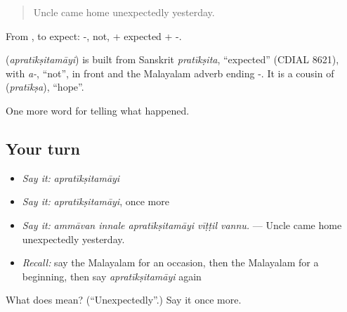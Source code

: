 \begin{quote}
Uncle came home unexpectedly yesterday.
\end{quote}

From , to expect: -, not, + expected + -.

\begin{cousinweb}
\textbf{} (\emph{apratīkṣitamāyi}) is built from Sanskrit \emph{pratīkṣita}, \textquotedblleft{}expected\textquotedblright{} (CDIAL 8621), with \emph{a-}, \textquotedblleft{}not\textquotedblright{}, in front and the Malayalam adverb ending -. It is a cousin of  (\emph{pratīkṣa}), \textquotedblleft{}hope\textquotedblright{}.
\end{cousinweb}

\begin{grammarlens}[title={What you've built}]
One more word for telling what happened.
\end{grammarlens}

\subsection*{Your turn}
\begin{itemize}
\raggedright
  \item \emph{Say it:} \emph{apratīkṣitamāyi}
  \item \emph{Say it:} \emph{apratīkṣitamāyi}, once more
  \item \emph{Say it:} \emph{ammāvan innale apratīkṣitamāyi vīṭṭil vannu.} — Uncle came home unexpectedly yesterday.
  \item \emph{Recall:} say the Malayalam for an occasion, then the Malayalam for a beginning, then say \emph{apratīkṣitamāyi} again
\end{itemize}

\begin{tcolorbox}[breakable,colback=teal!4,colframe=teal!35!black,title={Before you move on}]
What does  mean? (\textquotedblleft{}Unexpectedly\textquotedblright{}.) Say it once more.
\end{tcolorbox}
